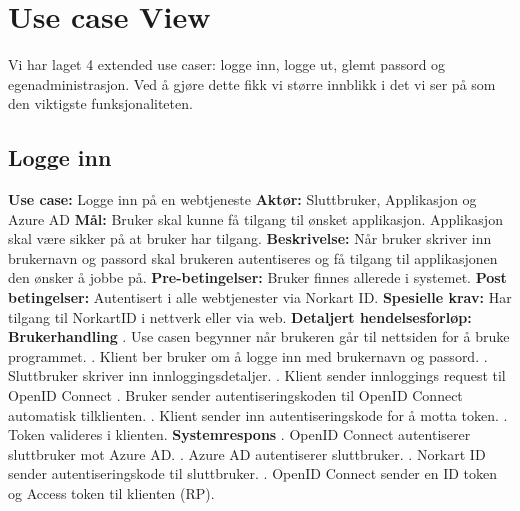 \section{Use case View}
\label{sec:use_case_view}
Vi har laget 4 extended use caser: logge inn, logge ut, glemt passord og egenadministrasjon. Ved å gjøre dette fikk vi større innblikk i det vi ser på som den viktigste funksjonaliteten.

\subsection{Logge inn}
\label{subsec:use_case_logge_inn}
\newline \textbf{Use case:} Logge inn på en webtjeneste
\newline \textbf{Aktør:}	Sluttbruker, Applikasjon og Azure AD
\newline \textbf{Mål:} Bruker skal kunne få tilgang til ønsket applikasjon. Applikasjon skal være sikker på at bruker har tilgang.
\newline \textbf{Beskrivelse:} Når bruker skriver inn brukernavn og passord skal brukeren autentiseres og få tilgang til applikasjonen den ønsker å jobbe på.
\newline \textbf{Pre-betingelser:} Bruker finnes allerede i systemet. 
\newline \textbf{Post betingelser:} Autentisert i alle webtjenester via Norkart ID.
\newline \textbf{Spesielle krav:} Har tilgang til NorkartID i nettverk eller via web.
\newline \textbf{Detaljert hendelsesforløp:}
\newline
\newline \textbf{Brukerhandling}
. Use casen begynner når brukeren går til nettsiden for å bruke programmet.
. Klient ber bruker om å  logge inn med brukernavn og passord.
. Sluttbruker skriver inn innloggingsdetaljer.
. Klient sender innloggings request til OpenID Connect
. Bruker sender autentiseringskoden til OpenID Connect automatisk tilklienten.
. Klient sender inn autentiseringskode for å motta token.
. Token valideres i klienten.
\newline
\newline \textbf{Systemrespons}
. OpenID Connect autentiserer sluttbruker mot Azure AD.
. Azure AD autentiserer sluttbruker.
. Norkart ID sender autentiseringskode til sluttbruker.
. OpenID Connect sender en ID token og Access token til klienten (RP).
\newline

